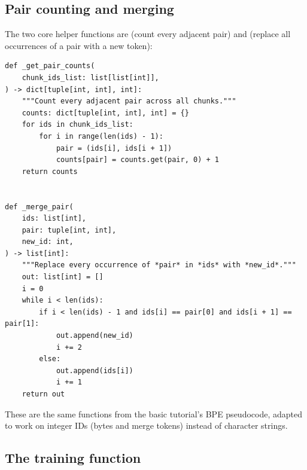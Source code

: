 \subsection{Pair counting and merging}

The two core helper functions are  (count every adjacent pair) and  (replace all occurrences of a pair with a new token):

\begin{lstlisting}
def _get_pair_counts(
    chunk_ids_list: list[list[int]],
) -> dict[tuple[int, int], int]:
    """Count every adjacent pair across all chunks."""
    counts: dict[tuple[int, int], int] = {}
    for ids in chunk_ids_list:
        for i in range(len(ids) - 1):
            pair = (ids[i], ids[i + 1])
            counts[pair] = counts.get(pair, 0) + 1
    return counts


def _merge_pair(
    ids: list[int],
    pair: tuple[int, int],
    new_id: int,
) -> list[int]:
    """Replace every occurrence of *pair* in *ids* with *new_id*."""
    out: list[int] = []
    i = 0
    while i < len(ids):
        if i < len(ids) - 1 and ids[i] == pair[0] and ids[i + 1] == pair[1]:
            out.append(new_id)
            i += 2
        else:
            out.append(ids[i])
            i += 1
    return out
\end{lstlisting}

These are the same functions from the basic tutorial's BPE pseudocode, adapted to work on integer IDs (bytes and merge tokens) instead of character strings.

\subsection{The training function}

